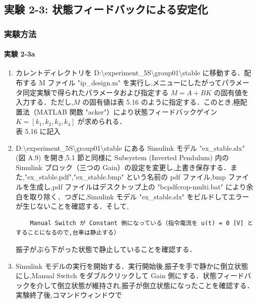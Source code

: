 \newpage

\subsection{実験 2-3: 状態フィードバックによる安定化}
\subsubsection{実験方法}

\paragraph{実験 2-3a}
\begin{enumerate}
  \item カレントディレクトリを D:\textbackslash experiment\_5S\textbackslash group01\textbackslash stable に移動する．配布する M ファイル "ip\_design.m" を実行し,メニューにしたがってパラメータ同定実験で得られたパラメータおよび指定する \( M = A + BK \) の固有値を入力する．ただし,\( M \) の固有値は表 5.16 のように指定する．このとき,極配置法（MATLAB 関数 "acker"）により状態フィードバックゲイン \( K = [k_1, k_2, k_3, k_4] \) が求められる．\\
        表 5.16 に記入
        
  \item D:\textbackslash experiment\_5S\textbackslash group01\textbackslash stable にある Simulink モデル "ex\_stable.slx" (図 A.9) を開き,5.1 節と同様に Subsystem (Inverted Pendulum) 内の Simulink ブロック（三つの Gain）の設定を変更し,上書き保存する．また,"ex\_stable.pdf","ex\_stable.bmp" という名前の pdf ファイル,bmp ファイルを生成し,pdf ファイルはデスクトップ上の "bcpdfcrop-multi.bat" により余白を取り除く．つぎに,Simulink モデル "ex\_stable.slx" をビルドしてエラーが生じないことを確認する．そして,
        
        \begin{tcolorbox}[colback=gray!5!white,colframe=gray!75!black]
          \begin{lstlisting}
    Manual Switch が Constant 側になっている（指令電流を u(t) = 0 [V] とすることになるので,台車は静止する）
    \end{lstlisting}
        \end{tcolorbox}
        
        振子がぶら下がった状態で静止していることを確認する．
        
  \item Simulink モデルの実行を開始する．実行開始後,振子を手で静かに倒立状態にし,Manual Switch をダブルクリックして Gain 側にする．状態フィードバックを介して倒立状態が維持され,振子が倒立状態になったことを確認する．実験終了後,コマンドウィンドウで
        

\end{enumerate}
